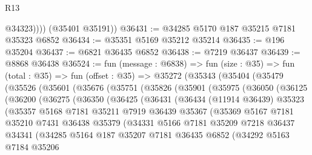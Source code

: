 \begin{lexlean}{R13}
\begin{coremodule}
              @34323))))
      (@35401 @35191))
@36431 := @34285 @5170 @187 @35215 @7181 @35323 @6852
@36434 := @35351 @5169 @35212 @35214
@36435 := @196 @35204
@36437 := @6821 @36435 @6852
@36438 := @7219 @36437
@36439 := @8868 @36438
@36524 := fun (message : @6838) =>
  fun (size : @35) =>
  fun (total : @35) =>
  fun (offset : @35) =>
  @35272
    (@35343
      (@35404
        (@35479
          (@35526
            (@35601
              (@35676
                (@35751
                  (@35826
                    (@35901
                      (@35975
                        (@36050
                          (@36125
                            (@36200
                              (@36275
                                (@36350
                                  (@36425
                                    (@36431
                                      (@36434
                                        (@11914 @36439)
                                        @35323
                                        (@35357
                                          @5168
                                          @7181
                                          @35211
                                          @7919
                                          @36439
                                          @35367
                                          (@35369
                                            @5167
                                            @7181
                                            @35210
                                            @7431
                                            @36438
                                            @35379
                                            (@34331
                                              @5166
                                              @7181
                                              @35209
                                              @7218
                                              @36437
                                              @34341
                                              (@34285
                                                @5164
                                                @187
                                                @35207
                                                @7181
                                                @36435
                                                @6852
                                                (@34292
                                                  @5163
                                                  @7184
                                                  @35206

\end{coremodule}
\end{lexlean}
